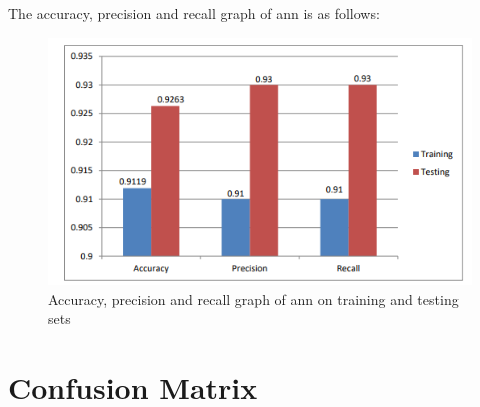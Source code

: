 The  accuracy, precision and recall graph of ann is as follows:

\begin{figure}[h]
  		\centering
    		\includegraphics[scale=0.9]{./Figures/cmgraph}
\caption{Accuracy, precision and recall graph of ann on training and testing sets}
\label{fig:5}
 		\end{figure}

\pagebreak
\section{Confusion Matrix}

